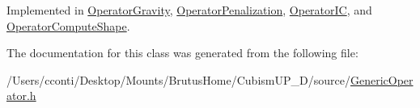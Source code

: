 Implemented in \hyperlink{class_operator_gravity_a7829a016bf4b27c2213493e363515c90}{Operator\+Gravity}, \hyperlink{class_operator_penalization_a55a7fe1ef7cfa3c48c98b0145cd24f00}{Operator\+Penalization}, \hyperlink{class_operator_i_c_adf547defe5168b4bb0181df741a71144}{Operator\+I\+C}, and \hyperlink{class_operator_compute_shape_ad9d3edd854162a93b5c7212bd694e73a}{Operator\+Compute\+Shape}.



The documentation for this class was generated from the following file\+:\begin{DoxyCompactItemize}
\item 
/\+Users/cconti/\+Desktop/\+Mounts/\+Brutus\+Home/\+Cubism\+U\+P\+\_\+D/source/\hyperlink{_generic_operator_8h}{Generic\+Operator.\+h}\end{DoxyCompactItemize}
